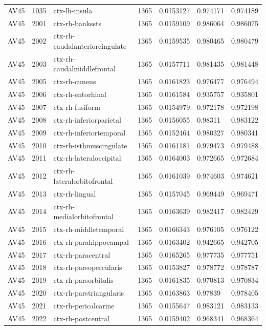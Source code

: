 \begin{landscape}
\begin{longtable}{lllllll}
AV45 & 1035 & ctx-lh-insula & 1365 & 0.0153127 & 0.974171 & 0.974189 \\
AV45 & 2001 & ctx-rh-bankssts & 1365 & 0.0159109 & 0.986064 & 0.986075 \\
AV45 & 2002 & ctx-rh-caudalanteriorcingulate & 1365 & 0.0159535 & 0.980465 & 0.980479 \\
AV45 & 2003 & ctx-rh-caudalmiddlefrontal & 1365 & 0.0157711 & 0.981435 & 0.981448 \\
AV45 & 2005 & ctx-rh-cuneus & 1365 & 0.0161823 & 0.976477 & 0.976494 \\
AV45 & 2006 & ctx-rh-entorhinal & 1365 & 0.0161584 & 0.935757 & 0.935801 \\
AV45 & 2007 & ctx-rh-fusiform & 1365 & 0.0154979 & 0.972178 & 0.972198 \\
AV45 & 2008 & ctx-rh-inferiorparietal & 1365 & 0.0156055 & 0.98311 & 0.983122 \\
AV45 & 2009 & ctx-rh-inferiortemporal & 1365 & 0.0152464 & 0.980327 & 0.980341 \\
AV45 & 2010 & ctx-rh-isthmuscingulate & 1365 & 0.0161181 & 0.979473 & 0.979488 \\
AV45 & 2011 & ctx-rh-lateraloccipital & 1365 & 0.0164003 & 0.972665 & 0.972684 \\
AV45 & 2012 & ctx-rh-lateralorbitofrontal & 1365 & 0.0161039 & 0.974603 & 0.974621 \\
AV45 & 2013 & ctx-rh-lingual & 1365 & 0.0157045 & 0.969449 & 0.969471 \\
AV45 & 2014 & ctx-rh-medialorbitofrontal & 1365 & 0.0163639 & 0.982417 & 0.982429 \\
AV45 & 2015 & ctx-rh-middletemporal & 1365 & 0.0166343 & 0.976105 & 0.976122 \\
AV45 & 2016 & ctx-rh-parahippocampal & 1365 & 0.0163402 & 0.942665 & 0.942705 \\
AV45 & 2017 & ctx-rh-paracentral & 1365 & 0.0165265 & 0.977735 & 0.977751 \\
AV45 & 2018 & ctx-rh-parsopercularis & 1365 & 0.0153827 & 0.978772 & 0.978787 \\
AV45 & 2019 & ctx-rh-parsorbitalis & 1365 & 0.0161835 & 0.970813 & 0.970834 \\
AV45 & 2020 & ctx-rh-parstriangularis & 1365 & 0.0163863 & 0.97839 & 0.978405 \\
AV45 & 2021 & ctx-rh-pericalcarine & 1365 & 0.0155647 & 0.983121 & 0.983133 \\
AV45 & 2022 & ctx-rh-postcentral & 1365 & 0.0159402 & 0.968341 & 0.968364 \\

\end{longtable}
\end{landscape}
